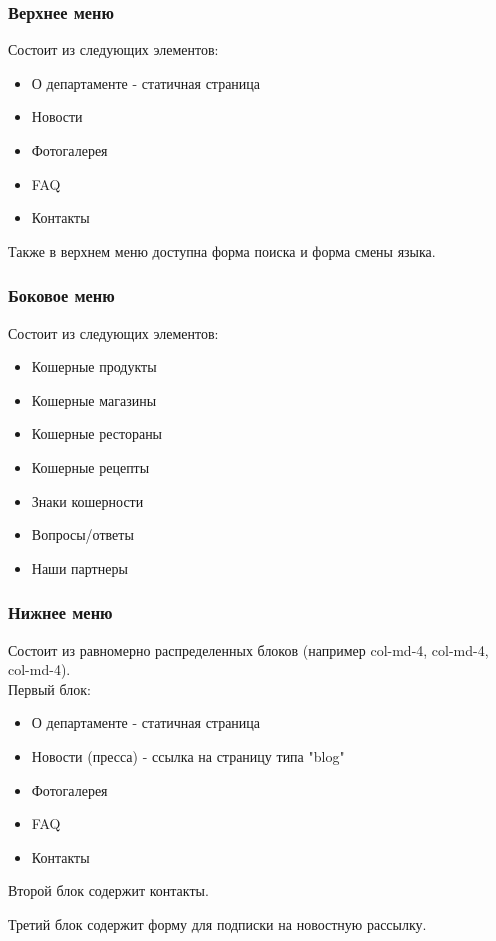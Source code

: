 \documentclass[DIV=calc, paper=a4, fontsize=11pt]{scrartcl} %
\begin{document}
\subsubsection{Верхнее меню}


Состоит из следующих элементов:
\begin{itemize}
	\item О департаменте - статичная страница
	\item Новости
	\item Фотогалерея
	\item FAQ
	\item Контакты
\end{itemize}
Также в верхнем меню доступна форма поиска и форма смены языка.

\subsubsection{Боковое меню}

Состоит из следующих элементов:
\begin{itemize}
	\item Кошерные продукты
	\item Кошерные магазины
	\item Кошерные рестораны
	\item Кошерные рецепты
	\item Знаки кошерности
	\item Вопросы/ответы
	\item Наши партнеры
\end{itemize}


\subsubsection{Нижнее меню}
Состоит из равномерно распределенных блоков (например col-md-4, col-md-4, col-md-4). 
\\[0.5cm]
Первый блок:
\begin{itemize}
	\item О департаменте - статичная страница
	\item Новости (пресса) - ссылка на страницу типа "blog"
	\item Фотогалерея
	\item FAQ
	\item Контакты
\end{itemize}

Второй блок содержит контакты.

Третий блок содержит форму для подписки на новостную рассылку.
\end{document}
